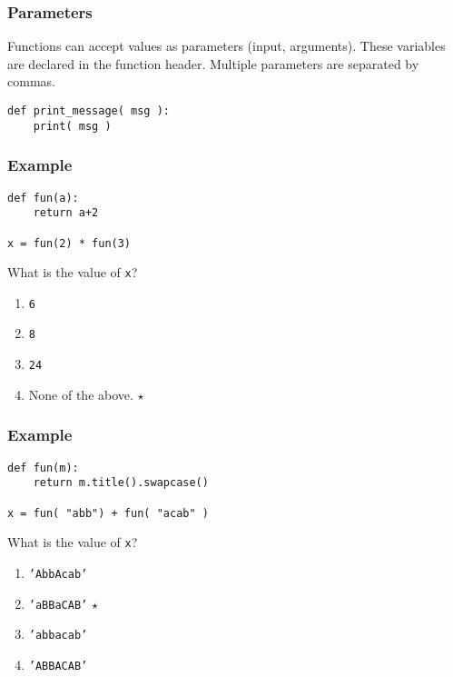 \documentclass[11pt]{beamer}
\begin{document}
\begin{frame}[fragile]
  \frametitle{Parameters}
  \Enlarge

  \begin{itemize}
  \myitem  Functions can accept values as parameters (input, arguments). %
  \myitem  These variables are declared in the function header. %
  \myitem  Multiple parameters are separated by commas. %
  \end{itemize}
  \begin{Verbatim}[commandchars=\\\{\},commentchar=\%]
def print_message( msg ):
    print( msg )
  \end{Verbatim}
\end{frame}

\begin{frame}[fragile]
  \frametitle{Example}
  \Enlarge

  \begin{Verbatim}[commandchars=\\\{\},commentchar=\%]
def fun(a):
    return a+2

x = fun(2) * fun(3)
  \end{Verbatim}
  What is the value of \texttt{x}?
  \begin{enumerate}[label=\Alph*]
  \item  \texttt{6}
  \item  \texttt{8}
  \item  \texttt{24}
  \item  None of the above.  $\star$
  \end{enumerate}
\end{frame}

\begin{frame}[fragile]
  \frametitle{Example}
  \Enlarge

  \begin{Verbatim}[commandchars=\\\{\},commentchar=\%]
def fun(m):
    return m.title().swapcase()

x = fun( "abb") + fun( "acab" )
  \end{Verbatim}
  What is the value of \texttt{x}?
  \begin{enumerate}[label=\Alph*]
  \item  \texttt{'AbbAcab'}
  \item  \texttt{'aBBaCAB'}  $\star$
  \item  \texttt{'abbacab'}
  \item  \texttt{'ABBACAB'}
  \end{enumerate}
\end{frame}
\end{document}
